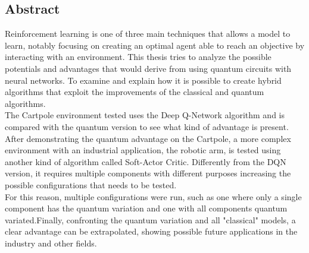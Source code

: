 \begin{center}
	\section*{Abstract}
\end{center}
Reinforcement learning is one of three main techniques that allows a model to learn, notably focusing on creating an optimal agent able to reach an objective by interacting with an environment. This thesis tries to analyze the possible potentials and advantages that would derive from using quantum circuits with neural networks. To examine and explain how it is possible to create hybrid algorithms that exploit the improvements of the classical and quantum algorithms.\\
The Cartpole environment tested uses the Deep Q-Network algorithm and is compared with the quantum version to see what kind of advantage is present.
After demonstrating the quantum advantage on the Cartpole, a more complex environment with an industrial application, the robotic arm, is tested using another kind of algorithm called Soft-Actor Critic. Differently from the DQN version, it requires multiple components with different purposes increasing the possible configurations that needs to be tested.\\
For this reason, multiple configurations were run, such as one where only a single component has the quantum variation and one with all components quantum variated.Finally, confronting the quantum variation and all "classical" models, a clear advantage can be extrapolated, showing possible future applications in the industry and other fields.

